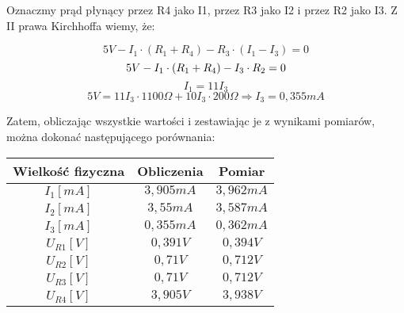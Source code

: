 \documentclass[polish,a4paper]{article}
\begin{document}
%

\begin{flushleft}
Oznaczmy prąd płynący przez R4 jako I1, przez R3 jako I2 i przez R2 jako I3.
Z II prawa Kirchhoffa wiemy, że:
\end{flushleft}

$$
5V - I_{1}\cdot(R_{1}+R_{4}) - R_{3}\cdot(I_{1} - I_{3}) = 0
$$
$$
5V - I_{1}\cdot(R_{1}+R_{4}) - I_{3}\cdot R_{2} = 0\\
$$
$$
I_{1}=11I_{3}
$$
$$
5V=11I_{3}\cdot1100\Omega + 10I_{3}\cdot200\Omega \Rightarrow I_{3}=0,355mA
$$

\begin{flushleft}
Zatem, obliczając wszystkie wartości i zestawiając je z wynikami pomiarów, można dokonać następującego porównania:
\end{flushleft}

\begin{center}
\begin{tabular}{|c|c|c|}
\hline
\textbf{Wielkość fizyczna} & \textbf{Obliczenia} & \textbf{Pomiar}\\
\hline
$I_{1}[mA]$ & $3,905mA$ & $3,962mA$\\
\hline
$I_{2}[mA]$ & $3,55mA$ & $3,587mA$\\
\hline
$I_{3}[mA]$ & $0,355mA$ & $0,362mA$\\
\hline
$U_{R1}[V]$ & $0,391V$ & $0,394V$\\
\hline
$U_{R2}[V]$ & $0,71V$ & $0,712V$\\
\hline
$U_{R3}[V]$ & $0,71V$ & $0,712V$\\
\hline
$U_{R4}[V]$ & $3,905V$ & $3,938V$\\
\hline
\end{tabular}
\end{center}
\end{document}
